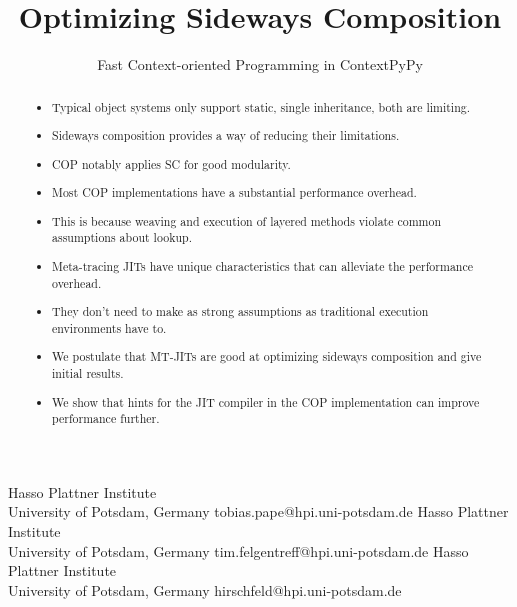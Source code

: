 \documentclass[preprint,english,10pt,nonatbib]{sigplanconf}
\begin{document}



\title{Optimizing Sideways Composition}
\subtitle{Fast Context-oriented Programming in ContextPyPy}

           {Hasso Plattner Institute\\ University of Potsdam, Germany}
           {tobias.pape@hpi.uni-potsdam.de}
           {Hasso Plattner Institute\\ University of Potsdam, Germany}
           {tim.felgentreff@hpi.uni-potsdam.de}
           {Hasso Plattner Institute\\ University of Potsdam, Germany}
           {hirschfeld@hpi.uni-potsdam.de}

\maketitle

\begin{abstract}
  \begin{itemize}
  \item Typical object systems only support static, single inheritance, both
    are limiting.
  \item Sideways composition provides a way of reducing their limitations.
  \item COP notably applies SC for good modularity.
  \item Most COP implementations have a substantial performance overhead.
  \item This is because weaving and execution of layered methods violate common
    assumptions about lookup.
  \item Meta-tracing JITs have unique characteristics that can alleviate the
    performance overhead.
  \item They don't need to make as strong assumptions as traditional execution
    environments have to.
  \item We postulate that MT-JITs are good at optimizing sideways composition
    and give initial results.
  \item We show that hints for the JIT compiler in the COP implementation can
    improve performance further.
  \end{itemize}
\end{abstract}
\end{document}
